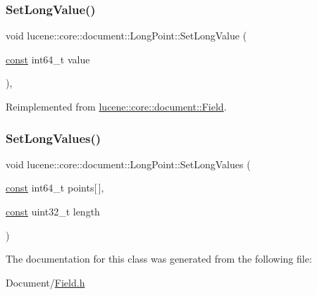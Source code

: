 \subsubsection{\texorpdfstring{Set\+Long\+Value()}{SetLongValue()}}
{\footnotesize\ttfamily void lucene\+::core\+::document\+::\+Long\+Point\+::\+Set\+Long\+Value (\begin{DoxyParamCaption}\item[{\mbox{\hyperlink{ZlibCrc32_8h_a2c212835823e3c54a8ab6d95c652660e}{const}} int64\+\_\+t}]{value }\end{DoxyParamCaption})\hspace{0.3cm}{\ttfamily [inline]}, {\ttfamily [virtual]}}



Reimplemented from \mbox{\hyperlink{classlucene_1_1core_1_1document_1_1Field_a949822599f392fb7fca20423902e535a}{lucene\+::core\+::document\+::\+Field}}.

\mbox{\label{classlucene_1_1core_1_1document_1_1LongPoint_a8561762cd09cae0222620709406e3ba2}} 
\subsubsection{\texorpdfstring{Set\+Long\+Values()}{SetLongValues()}}
{\footnotesize\ttfamily void lucene\+::core\+::document\+::\+Long\+Point\+::\+Set\+Long\+Values (\begin{DoxyParamCaption}\item[{\mbox{\hyperlink{ZlibCrc32_8h_a2c212835823e3c54a8ab6d95c652660e}{const}} int64\+\_\+t}]{points\mbox{[}$\,$\mbox{]},  }\item[{\mbox{\hyperlink{ZlibCrc32_8h_a2c212835823e3c54a8ab6d95c652660e}{const}} uint32\+\_\+t}]{length }\end{DoxyParamCaption})\hspace{0.3cm}{\ttfamily [inline]}}



The documentation for this class was generated from the following file\+:\begin{DoxyCompactItemize}
\item 
Document/\mbox{\hyperlink{Document_2Field_8h}{Field.\+h}}\end{DoxyCompactItemize}

